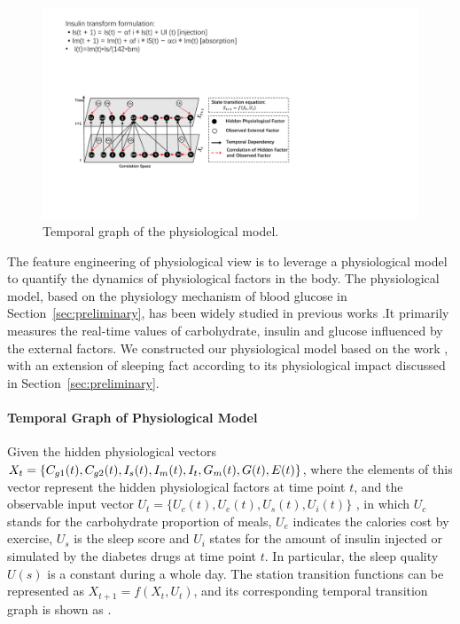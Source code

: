 \begin{figure}[t]
  \centering
  \includegraphics[width=0.9\columnwidth]{./img/Physiological_correlation1.pdf}
  \caption{Temporal graph of the physiological model.}
  \label{fig:phymodel}
\end{figure}
The feature engineering of physiological view is to leverage a physiological model to quantify the dynamics of physiological factors in the body. The
physiological model, based on the physiology mechanism of blood glucose in Section~\ref{sec:preliminary}, has been widely studied in previous works \cite{bib:briegel2002nonlinear,bib:duke2010intelligent, bib:plis2014machine}.It primarily measures the real-time values of carbohydrate, insulin and glucose influenced by the external factors. We constructed our physiological model based on the work \cite{bib:duke2010intelligent},
with an extension of sleeping fact according to its physiological impact discussed in Section~\ref{sec:preliminary}.

\paragraph{Temporal Graph of Physiological Model}
Given the hidden physiological vectors $X_{t}=\{C_{g1}(t), C_{g2}(t),\\ I_{s}(t),I_{m}(t), I_{t}, G_{m}(t), G(t), E(t)\}$, where the elements of this vector represent
the hidden physiological factors at time point $t$, and the observable input vector $U_{t}=\{U_{c}(t), U_{e}(t), U_{s}(t), U_{i}(t)\}$ , in which $U_{c}$ stands for the
carbohydrate proportion of meals, $U_{e}$ indicates the calories cost by exercise,  $U_{s}$ is the sleep score and $U_{i}$ states for the amount of insulin injected or simulated
by the diabetes drugs  at time point $t$. In particular, the sleep quality $U(s)$ is a constant during a whole day.
The station transition functions can be represented as $X_{t+1}=f(X_t, U_t)$, and its corresponding
temporal transition graph is shown as .  %


